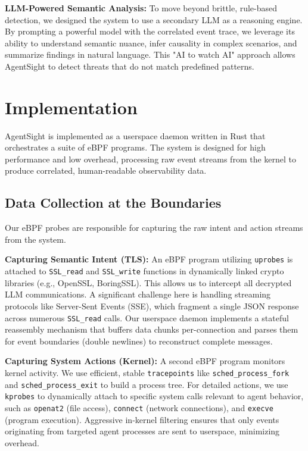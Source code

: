 \textbf{LLM-Powered Semantic Analysis:} To move beyond brittle, rule-based detection, we designed the system to use a secondary LLM as a reasoning engine. By prompting a powerful model with the correlated event trace, we leverage its ability to understand semantic nuance, infer causality in complex scenarios, and summarize findings in natural language. This "AI to watch AI" approach allows AgentSight to detect threats that do not match predefined patterns.

\section{Implementation}
AgentSight is implemented as a userspace daemon written in Rust that orchestrates a suite of eBPF programs. The system is designed for high performance and low overhead, processing raw event streams from the kernel to produce correlated, human-readable observability data.

\subsection{Data Collection at the Boundaries}
Our eBPF probes are responsible for capturing the raw intent and action streams from the system.

\textbf{Capturing Semantic Intent (TLS):} An eBPF program utilizing \texttt{uprobes} is attached to \texttt{SSL\_read} and \texttt{SSL\_write} functions in dynamically linked crypto libraries (e.g., OpenSSL, BoringSSL). This allows us to intercept all decrypted LLM communications. A significant challenge here is handling streaming protocols like Server-Sent Events (SSE), which fragment a single JSON response across numerous \texttt{SSL\_read} calls. Our userspace daemon implements a stateful reassembly mechanism that buffers data chunks per-connection and parses them for event boundaries (double newlines) to reconstruct complete messages.

\textbf{Capturing System Actions (Kernel):} A second eBPF program monitors kernel activity. We use efficient, stable \texttt{tracepoints} like \texttt{sched\_process\_fork} and \texttt{sched\_process\_exit} to build a process tree. For detailed actions, we use \texttt{kprobes} to dynamically attach to specific system calls relevant to agent behavior, such as \texttt{openat2} (file access), \texttt{connect} (network connections), and \texttt{execve} (program execution). Aggressive in-kernel filtering ensures that only events originating from targeted agent processes are sent to userspace, minimizing overhead.

